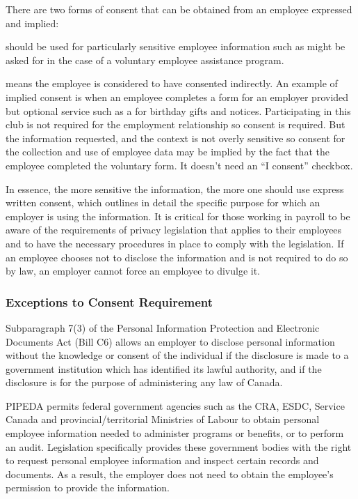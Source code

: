 \documentclass[letterpaper,10pt,english]{sphinxmanual}
\begin{document}
\sphinxAtStartPar
There are two forms of consent that can be obtained from an employee \sphinxhyphen{} expressed and
implied:

\sphinxAtStartPar
{} should be used for particularly sensitive employee information such as
might be asked for in the case of a voluntary employee assistance program.

\sphinxAtStartPar
{} means the employee is considered to have consented indirectly. An
example of implied consent is when an employee completes a form for an employer provided
but optional service such as a  for birthday gifts and notices. Participating in this
club is not required for the employment relationship so consent is required. But the
information requested, and the context is not overly sensitive so consent for the collection
and use of employee data may be implied by the fact that the employee completed the
voluntary form. It doesn’t need an “I consent” checkbox.

\sphinxAtStartPar
In essence, the more sensitive the information, the more one should use express written
consent, which outlines in detail the specific purpose for which an employer is using the
information. It is critical for those working in payroll to be aware of the requirements of
privacy legislation that applies to their employees and to have the necessary procedures in
place to comply with the legislation. If an employee chooses not to disclose the information
and is not required to do so by law, an employer cannot force an employee to divulge it.


\subsubsection{Exceptions to Consent Requirement}
\label{\detokenize{2_compliance:exceptions-to-consent-requirement}}
\sphinxAtStartPar
Subparagraph 7(3) of the Personal Information Protection and Electronic Documents Act
(Bill C6) allows an employer to disclose personal information without the knowledge or
consent of the individual if the disclosure is made to a government institution which has
identified its lawful authority, and if the disclosure is for the purpose of administering any
law of Canada.

\sphinxAtStartPar
PIPEDA permits federal government agencies such as the CRA, ESDC, Service Canada and
provincial/territorial Ministries of Labour to obtain personal employee information needed to
administer programs or benefits, or to perform an audit. Legislation specifically provides
these government bodies with the right to request personal employee information and inspect
certain records and documents. As a result, the employer does not need to obtain the
employee’s permission to provide the information.
\end{document}

